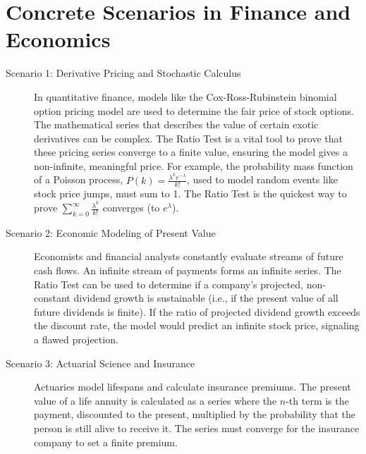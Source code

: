 \documentclass{article}
\begin{document}
\section{Concrete Scenarios in Finance and Economics}
\begin{description}
    \item[Scenario 1: Derivative Pricing and Stochastic Calculus]
    In quantitative finance, models like the Cox-Ross-Rubinstein binomial option pricing model are used to determine the fair price of stock options. The mathematical series that describes the value of certain exotic derivatives can be complex. The Ratio Test is a vital tool to prove that these pricing series converge to a finite value, ensuring the model gives a non-infinite, meaningful price. For example, the probability mass function of a Poisson process, $P(k) = \frac{\lambda^k e^{-\lambda}}{k!}$, used to model random events like stock price jumps, must sum to 1. The Ratio Test is the quickest way to prove $\sum_{k=0}^\infty \frac{\lambda^k}{k!}$ converges (to $e^\lambda$).

    \item[Scenario 2: Economic Modeling of Present Value]
    Economists and financial analysts constantly evaluate streams of future cash flows. An infinite stream of payments forms an infinite series. The Ratio Test can be used to determine if a company's projected, non-constant dividend growth is sustainable (i.e., if the present value of all future dividends is finite). If the ratio of projected dividend growth exceeds the discount rate, the model would predict an infinite stock price, signaling a flawed projection.

    \item[Scenario 3: Actuarial Science and Insurance]
    Actuaries model lifespans and calculate insurance premiums. The present value of a life annuity is calculated as a series where the $n$-th term is the payment, discounted to the present, multiplied by the probability that the person is still alive to receive it. The series must converge for the insurance company to set a finite premium.
\end{description}
\end{document}
